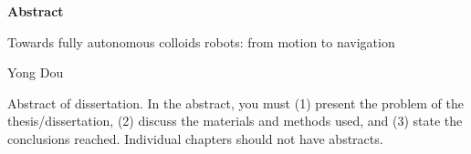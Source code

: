 
\begin{titlepage}
\begin{center}

\vspace*{5\baselineskip}
\textbf{\large Abstract}

Towards fully autonomous  colloids robots: from motion to navigation

Yong Dou
\end{center}
\begin{flushleft}
\hspace{10mm}Abstract of dissertation. In the abstract, you must (1) present the problem of the thesis/dissertation, (2) discuss the materials and methods used, and (3) state the conclusions reached. Individual chapters should not have abstracts.

\end{flushleft}
\vspace*{\fill}
\end{titlepage}
